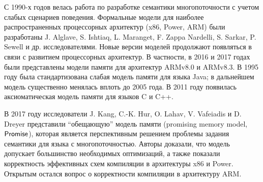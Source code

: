 
{\progress}
С 1990-х годов велась работа по
разработке семантики многопоточности с учетом слабых сценариев поведения.
Формальные модели для наиболее распространенных процессорных архитектур (x86, Power, ARM)
были разработаны J. Alglave, S. Ishtiaq, L. Maranget, F. Zappa Nardelli, S. Sarkar, P. Sewell и др.
исследователями.
Новые версии моделей продолжают появляться в связи с развитием процессорных архитектур.
В частности, в 2016 и 2017 годах были представлены модели памяти для архитектур ARMv8.0 и
ARMv8.3.
В 1995 году была стандартизована слабая модель памяти для языка Java;
в дальнейшем модель существенно менялась вплоть до 2005 года.
В 2011 году появилась аксиоматическая модель памяти для языков C и C++.

В 2017 году исследователи J. Kang, C.-K. Hur, O. Lahav, V. Vafeiadis и D. Dreyer
представили ``обещающую'' модель памяти (promising memory model, $\mathsf{Promise}$), которая является перспективным
решением проблемы задания семантики для языка с многопоточностью. Авторы 
доказали, что модель допускает большинство необходимых оптимизаций, а также показали корректность
эффективных схем компиляции в архитектуры x86 и Power. Открытым остался вопрос о корректности компиляции
в архитектуру ARM.

